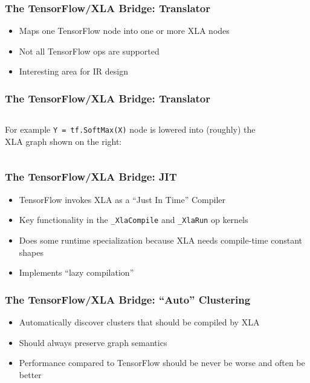 \documentclass{beamer}
\newcommand{\image}[1]{\begin{figure}\fbox{\texttt{[image: ./images/\#1.pdf]}}\end{figure}}
\begin{document}
\begin{frame}[fragile]
\frametitle{The TensorFlow/XLA Bridge: Translator}
  \begin{itemize}
  \item Maps one TensorFlow node into one or more XLA nodes
  \item Not all TensorFlow ops are supported
  \item Interesting area for IR design
  \end{itemize}
\end{frame}


\begin{frame}[fragile]
\frametitle{The TensorFlow/XLA Bridge: Translator}
  \begin{columns}
    \begin{column}{0.48\textwidth}
      For example \texttt{Y = tf.SoftMax(X)} node is lowered into (roughly) the XLA graph shown on the right:
    \end{column}
    \begin{column}{0.48\textwidth}
      \image{softmax-lowering}
    \end{column}
  \end{columns}
\end{frame}


\begin{frame}[fragile]
  \frametitle{The TensorFlow/XLA Bridge: JIT}
  \begin{itemize}
  \item TensorFlow invokes XLA as a ``Just In Time'' Compiler
  \item Key functionality in the \texttt{\_XlaCompile} and \texttt{\_XlaRun} op kernels
  \item Does some runtime specialization because XLA needs compile-time constant shapes
  \item Implements ``lazy compilation''
  \end{itemize}
\end{frame}

\begin{frame}[fragile]
  \frametitle{The TensorFlow/XLA Bridge: ``Auto'' Clustering}
  \begin{itemize}
  \item Automatically discover clusters that should be compiled by XLA
  \item Should always preserve graph semantics
  \item Performance compared to TensorFlow should be never be worse and often be better
  \end{itemize}
\end{frame}
\end{document}
